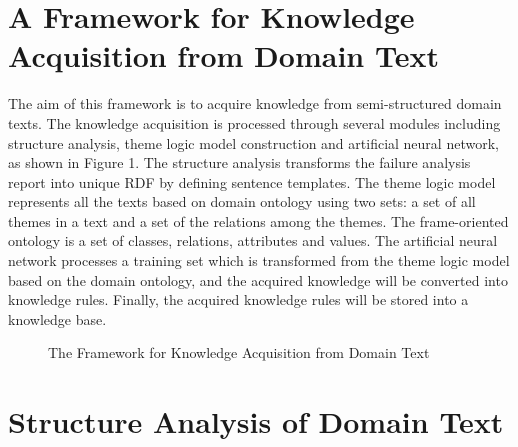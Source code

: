 \documentclass{elsarticle}
\begin{document}
\section{A Framework for Knowledge Acquisition from Domain Text
}
\label{sec:fram-knowl-acqu}

The aim of this framework is to acquire knowledge from semi-structured
domain texts. The knowledge acquisition is processed through several
modules including structure analysis, theme logic model construction
and artificial neural network, as shown in Figure 1. The structure
analysis transforms the failure analysis report into unique RDF by
defining sentence templates. The theme logic model represents all the
texts based on domain ontology using two sets: a set of all themes in
a text and a set of the relations among the themes. The frame-oriented ontology is a set of classes, relations, attributes and
values. The artificial neural network processes a training set which is 
transformed from the theme logic model based on the domain ontology,
and the acquired knowledge will be converted into knowledge rules. Finally, the acquired knowledge rules will be stored into a knowledge base.
\begin{figure}[htp]
  \centering

  \caption{The Framework for Knowledge Acquisition from Domain Text}
  \label{fig:1}
\end{figure}

\section{Structure Analysis of Domain Text 
}
\label{sec:struct-analys-doma}
\end{document}
